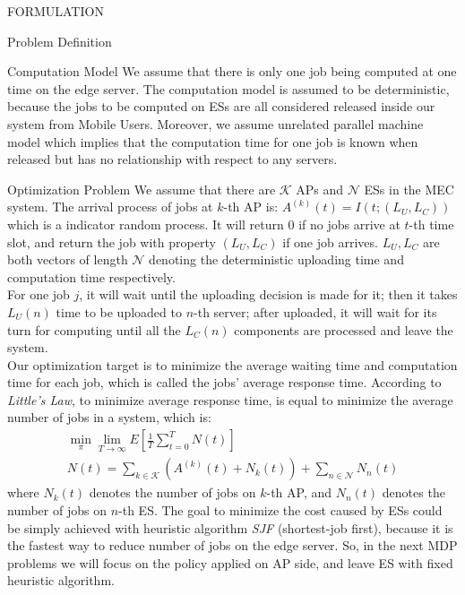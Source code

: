 \documentclass[10pt, conference, letterpaper]{IEEEtran}
\begin{document}
\begin{section}{FORMULATION}
\begin{subsection}{Problem Definition}
            \begin{subsubsection}{Computation Model}
                We assume that there is only one job being computed at one time on the edge server. The computation model is assumed to be deterministic, because the jobs to be computed on ESs are all considered released inside our system from Mobile Users.
                Moreover, we assume unrelated parallel machine model which implies that the computation time for one job is known when released but has no relationship with respect to any servers.
            \end{subsubsection}
            
            \begin{subsubsection}{Optimization Problem}
                We assume that there are $\mathcal{K}$ APs and $\mathcal{N}$ ESs in the MEC system.
                The arrival process of jobs at $k$-th AP is: $A^{(k)}(t)=I(t; (L_U, L_C))$ which is a indicator random process. It will return $0$ if no jobs arrive at $t$-th time slot, and return the job with property $(L_U, L_C)$ if one job arrives. $L_U, L_C$ are both vectors of length $\mathcal{N}$ denoting the deterministic uploading time and computation time respectively.
                \\
                For one job $j$, it will wait until the uploading decision is made for it; then it takes $L_U(n)$ time to be uploaded to $n$-th server; after uploaded, it will wait for its turn for computing until all the $L_C(n)$ components are processed and leave the system.
                \\
                Our optimization target is to minimize the average waiting time and computation time for each job, which is called the jobs' average response time. According to \emph{Little’s Law}, to minimize average response time, is equal to minimize the average number of jobs in a system, which is:
                \begin{gather}
                    \min_{\pi} \lim_{T \to \infty} E[\frac{1}{T} \sum_{t=0}^{T} N(t)]
                    \\
                    N(t) = \sum_{k \in \mathcal{K}} (A^{(k)}(t) + N_k(t))
                            + \sum_{n \in \mathcal{N}} N_n(t)
                \end{gather}
                where $N_k(t)$ denotes the number of jobs on $k$-th AP, and $N_n(t)$ denotes the number of jobs on $n$-th ES.
                The goal to minimize the cost caused by ESs could be simply achieved with heuristic algorithm \emph{SJF} (shortest-job first), because it is the fastest way to reduce number of jobs on the edge server. So, in the next MDP problems we will focus on the policy applied on AP side, and leave ES with fixed heuristic algorithm.
            \end{subsubsection}
        \end{subsection}


\end{section}
\end{document}
